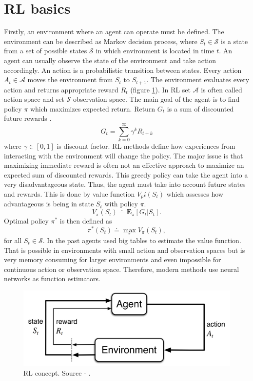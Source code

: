 \section{RL basics}
Firstly, an environment where an agent can operate must be defined. The environment can be described as Markov decision process, where $S_t \in \mathcal{S}$ is a state from a set of possible states $\mathcal{S}$ in which environment is located in time $t$. An agent can usually observe the state of the environment and take action accordingly. An action is a probabilistic transition between states. Every action $A_t \in \mathcal{A}$ moves the environment from $S_t$ to $S_{t+1}$. The environment evaluates every action and returns appropriate reward $R_t$ (figure \ref{fig:rlconcept}). In RL set $\mathcal{A}$ is often called action space and set $\mathcal{S}$ observation space. The main goal of the agent is to find policy $\pi$ which maximizes expected return. Return $G_t$ is a sum of discounted future rewards \cite{sutton2012}.
\begin{equation}
G_t = \sum\limits_{k=0}^{\infty}\gamma^k R_{t+k}
\end{equation}
where $\gamma \in [0,1]$ is discount factor. RL methods define how experiences from interacting with the environment will change the policy.  The major issue is that maximizing immediate reward is often not an effective approach to maximize an expected sum of discounted rewards. This greedy policy can take the agent into a very disadvantageous state. Thus, the agent must take into account future states and rewards. This is done by value function $V_pi(S_t)$ which assesses how advantageous is being in state $S_t$ with policy $\pi$.
\begin{equation}
V_\pi(S_t) \doteq  \mathbf{E}_\pi[G_t | S_t].
\end{equation}
Optimal policy $\pi^*$ is then defined as
\begin{equation}
\pi^*(S_t) \doteq \max\limits_\pi V_\pi(S_t),
\end{equation}
for all $S_t \in \mathcal{S}$.
In the past agents used big tables to estimate the value function. That is possible in environments with small action and observation spaces but is very memory consuming for larger environments and even impossible for continuous action or observation space. Therefore, modern methods use neural networks as function estimators.
\begin{figure}[!h]
\centering
\includegraphics[scale=0.3]{fig/RL-concept.png}
\caption[RL concept]{RL concept. Source - \cite{sutton2012}.}
\label{fig:rlconcept}
\end{figure}
\pagebreak

